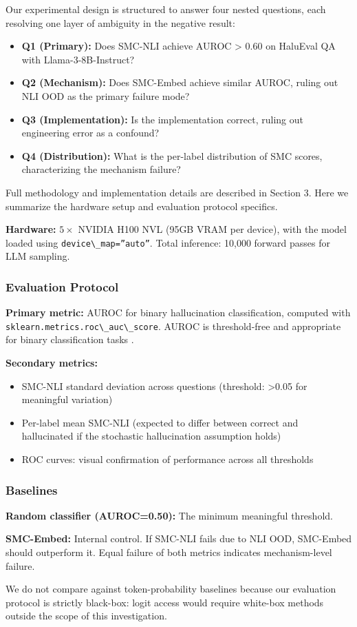 
Our experimental design is structured to answer four nested questions, each resolving one layer of ambiguity in the negative result:

\begin{itemize}
\item \textbf{Q1 (Primary):} Does SMC-NLI achieve AUROC > 0.60 on HaluEval QA with Llama-3-8B-Instruct?
\item \textbf{Q2 (Mechanism):} Does SMC-Embed achieve similar AUROC, ruling out NLI OOD as the primary failure mode?
\item \textbf{Q3 (Implementation):} Is the implementation correct, ruling out engineering error as a confound?
\item \textbf{Q4 (Distribution):} What is the per-label distribution of SMC scores, characterizing the mechanism failure?
\end{itemize}

Full methodology and implementation details are described in Section 3. Here we summarize the hardware setup and evaluation protocol specifics.

\textbf{Hardware:} $5\times$ NVIDIA H100 NVL (95GB VRAM per device), with the model loaded using \texttt{device\textbackslash \_map=''auto''}. Total inference: 10,000 forward passes for LLM sampling.

\subsubsection{Evaluation Protocol}

\textbf{Primary metric:} AUROC for binary hallucination classification, computed with \texttt{sklearn.metrics.roc\textbackslash \_auc\textbackslash \_score}. AUROC is threshold-free and appropriate for binary classification tasks \citep{Xiong2023Can}.

\textbf{Secondary metrics:}
\begin{itemize}
\item SMC-NLI standard deviation across questions (threshold: >0.05 for meaningful variation)
\item Per-label mean SMC-NLI (expected to differ between correct and hallucinated if the stochastic hallucination assumption holds)
\item ROC curves: visual confirmation of performance across all thresholds
\end{itemize}

\subsubsection{Baselines}

\textbf{Random classifier (AUROC=0.50):} The minimum meaningful threshold.

\textbf{SMC-Embed:} Internal control. If SMC-NLI fails due to NLI OOD, SMC-Embed should outperform it. Equal failure of both metrics indicates mechanism-level failure.

We do not compare against token-probability baselines \citep{Kadavath2022Language} because our evaluation protocol is strictly black-box: logit access would require white-box methods outside the scope of this investigation.

